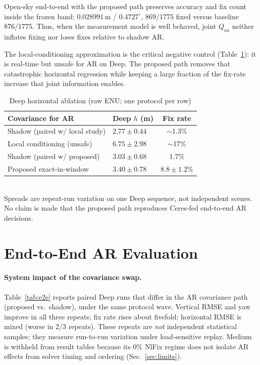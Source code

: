 \documentclass[letterpaper, journal, twocolumn]{IEEEtran}
\begin{document}
Open-sky end-to-end with the proposed path preserves accuracy and fix count
inside the frozen band: $0.028991$\,m / $0.4727^\circ$, 869/1775 fixed versus
baseline 876/1775.
Thus, when the measurement model is well behaved, joint $Q_{aa}$ neither
inflates fixing nor loses fixes relative to shadow AR.

The local-conditioning approximation is the critical negative control
(Table~\ref{tab:ablation}): it is real-time but unsafe for AR on Deep.
The proposed path removes that catastrophic horizontal regression while
keeping a large fraction of the fix-rate increase that joint information
enables.

\begin{table}[!t]
\caption{Deep horizontal ablation (raw ENU; one protocol per row)}
\label{tab:ablation}
\centering
\scriptsize
\begin{tabular}{@{}llc@{}}
\toprule
Covariance for AR & Deep $h$ (m) & Fix rate \\
\midrule
Shadow (paired w/ local study) & $2.77{\pm}0.44$ & $\sim$1.3\% \\
Local conditioning (unsafe) & $6.75{\pm}2.98$ & $\sim$17\% \\
Shadow (paired w/ proposed) & $3.03{\pm}0.68$ & 1.7\% \\
Proposed exact-in-window & $3.40{\pm}0.78$ & $8.8{\pm}1.2\%$ \\
\bottomrule
\end{tabular}\\[0.2em]
{\scriptsize Spreads are repeat-run variation on one Deep sequence, not
independent scenes. No claim is made that the proposed path reproduces
Ceres-fed end-to-end AR decisions.}
\end{table}

\section{End-to-End AR Evaluation}
\label{sec:e2e}

\paragraph{System impact of the covariance swap.}
Table~\ref{tab:e2e} reports paired Deep runs that differ in the AR covariance
path (proposed vs.\ shadow), under the same protocol wave.
Vertical RMSE and yaw improve in all three repeats; fix rate rises about
fivefold; horizontal RMSE is mixed (worse in 2/3 repeats).
These repeats are \emph{not} independent statistical samples; they measure
run-to-run variation under load-sensitive replay.
Medium is withheld from result tables because its 0\% NlFix regime does not
isolate AR effects from solver timing and ordering (Sec.~\ref{sec:limits}).
\end{document}
